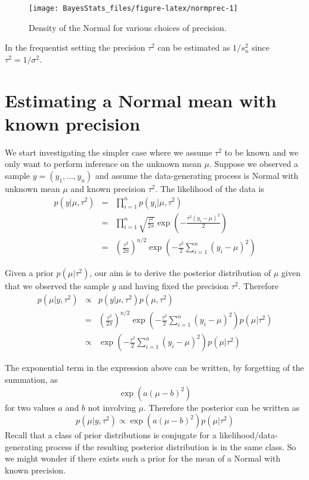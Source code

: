 \documentclass[
]{book}
\begin{document}
\begin{figure}

{\centering \texttt{[image: BayesStats\_files/figure-latex/normprec-1]} 

}

\caption{Density of the Normal for various choices of precision.}\label{fig:normprec}
\end{figure}

In the frequentist setting the precision \(\tau^2\) can be estimated as \(1/s^2_n\) since \(\tau^2=1/\sigma^2\).

\hypertarget{estimating-a-normal-mean-with-known-precision}{%
\section{Estimating a Normal mean with known precision}\label{estimating-a-normal-mean-with-known-precision}}

We start investigating the simpler case where we assume \(\tau^2\) to be known and we only want to perform inference on the unknown mean \(\mu\). Suppose we observed a sample \(y=(y_1,\dots,y_n)\) and assume the data-generating process is Normal with unknown mean \(\mu\) and known precision \(\tau^2\). The likelihood of the data is
\begin{eqnarray*}
p(y|\mu,\tau^2)&=&\prod_{i=1}^np(y_i|\mu,\tau^2)\\
&=&\prod_{i=1}^n\sqrt{\frac{\tau^2}{2\pi}}\exp\left(-\frac{\tau^2(y_i-\mu)^2}{2}\right)\\
&=& \left(\frac{\tau^2}{2\pi}\right)^{n/2}\exp\left(-\frac{\tau^2}{2}\sum_{i=1}^n(y_i-\mu)^2\right)
\end{eqnarray*}

Given a prior \(p(\mu|\tau^2)\), our aim is to derive the posterior distribution of \(\mu\) given that we observed the sample \(y\) and having fixed the precision \(\tau^2\). Therefore
\begin{eqnarray*}
p(\mu|y,\tau^2)&\propto& p(y|\mu,\tau^2)p(\mu,\tau^2)\\
&=& \left(\frac{\tau^2}{2\pi}\right)^{n/2}\exp\left(-\frac{\tau^2}{2}\sum_{i=1}^n(y_i-\mu)^2\right)p(\mu|\tau^2)\\
&\propto& \exp\left(-\frac{\tau^2}{2}\sum_{i=1}^n(y_i-\mu)^2\right)p(\mu|\tau^2)
\end{eqnarray*}

The exponential term in the expression above can be written, by forgetting of the summation, as
\[
\exp(a(\mu-b)^2)
\]
for two values \(a\) and \(b\) not involving \(\mu\). Therefore the posterior can be written as
\[
p(\mu|y,\tau^2) \propto \exp(a(\mu-b)^2)p(\mu|\tau^2)
\]
Recall that a class of prior distributions is conjugate for a likelihood/data-generating process if the resulting posterior distribution is in the same class. So we might wonder if there exists such a prior for the mean of a Normal with known precision.
\end{document}
